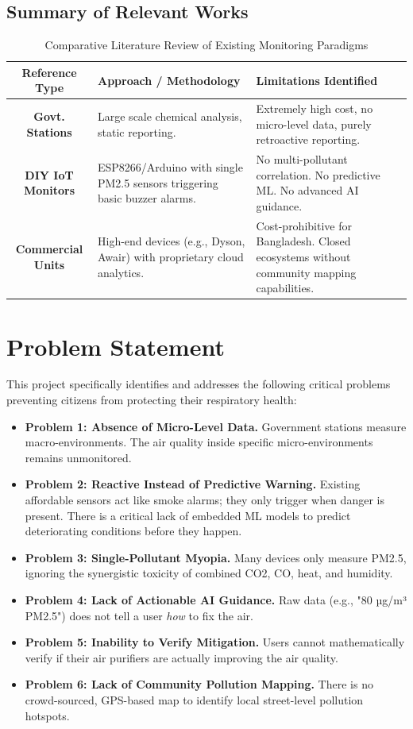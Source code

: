 \documentclass[12pt,a4paper]{report}
\begin{document}
\section{Summary of Relevant Works}
\begin{table}[H]
    \centering
    \begin{tabularx}{\textwidth}{|c|X|X|}
        \hline
        \textbf{Reference Type} & \textbf{Approach / Methodology} & \textbf{Limitations Identified} \\ \hline
        \textbf{Govt. Stations} & Large scale chemical analysis, static reporting. & Extremely high cost, no micro-level data, purely retroactive reporting. \\ \hline
        \textbf{DIY IoT Monitors} & ESP8266/Arduino with single PM2.5 sensors triggering basic buzzer alarms. & No multi-pollutant correlation. No predictive ML. No advanced AI guidance. \\ \hline
        \textbf{Commercial Units} & High-end devices (e.g., Dyson, Awair) with proprietary cloud analytics. & Cost-prohibitive for Bangladesh. Closed ecosystems without community mapping capabilities. \\ \hline
    \end{tabularx}
    \caption{Comparative Literature Review of Existing Monitoring Paradigms}
\end{table}

\chapter{Problem Statement}
This project specifically identifies and addresses the following critical problems preventing citizens from protecting their respiratory health:

\begin{itemize}[leftmargin=*, itemsep=12pt]
    \item \textbf{Problem 1: Absence of Micro-Level Data.} Government stations measure macro-environments. The air quality inside specific micro-environments remains unmonitored.
    \item \textbf{Problem 2: Reactive Instead of Predictive Warning.} Existing affordable sensors act like smoke alarms; they only trigger when danger is present. There is a critical lack of embedded ML models to predict deteriorating conditions before they happen.
    \item \textbf{Problem 3: Single-Pollutant Myopia.} Many devices only measure PM2.5, ignoring the synergistic toxicity of combined CO2, CO, heat, and humidity.
    \item \textbf{Problem 4: Lack of Actionable AI Guidance.} Raw data (e.g., "80 µg/m³ PM2.5") does not tell a user \textit{how} to fix the air.
    \item \textbf{Problem 5: Inability to Verify Mitigation.} Users cannot mathematically verify if their air purifiers are actually improving the air quality.
    \item \textbf{Problem 6: Lack of Community Pollution Mapping.} There is no crowd-sourced, GPS-based map to identify local street-level pollution hotspots.
\end{itemize}
\end{document}
